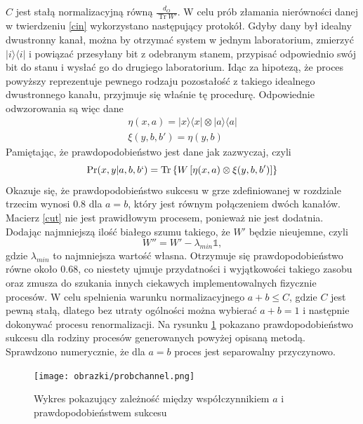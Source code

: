 \documentclass[10pt]{article} %
\DeclareMathOperator{\Trs}{Tr}
\newcommand{\Ket}[1]{|#1\rangle}
\newcommand{\Bra}[1]{\langle#1|}
\newcommand{\I}{\mathbb{1}}
\begin{document}
$C$ jest stałą normalizacyjną równą $\frac{d_O}{\Trs W'}$.
W celu prób złamania nierówności danej w twierdzeniu \ref{cin} wykorzystano następujący protokół. Gdyby dany był idealny dwustronny kanał, można by otrzymać system w jednym laboratorium, zmierzyć $\Ket{i}\Bra{i}$ i powiązać przesyłany bit z odebranym stanem, przypisać odpowiednio swój bit do stanu i wysłać go do drugiego laboratorium. Idąc za hipotezą, że proces powyższy reprezentuje pewnego rodzaju pozostałość z takiego idealnego dwustronnego kanału, przyjmuje się właśnie tę procedurę. Odpowiednie odwzorowania są więc dane
\begin{gather}
\eta(x,a) = \Ket{x}\Bra{x} \otimes \Ket{a}\Bra{a} \\
\xi(y,b,b') = \eta(y,b)
\end{gather}
Pamiętając, że prawdopodobieństwo jest dane jak zazwyczaj, czyli
\begin{equation}
\Pr(x,y|a,b,b`) = \Trs\left\{{W\left[\eta(x,a) \otimes \xi(y,b,b') \right]}\right\}
\end{equation}
Okazuje się, że prawdopodobieństwo sukcesu w grze zdefiniowanej w rozdziale trzecim wynosi $0.8$ dla $a=b$, który jest równym połączeniem dwóch kanałów.
Macierz \eqref{cut} nie jest prawidłowym procesem, ponieważ nie jest dodatnia. Dodając najmniejszą ilość białego szumu takiego, że $W'$ będzie nieujemne, czyli
\begin{equation}
W'' = W' - \lambda_{min} \I,
\end{equation} gdzie $\lambda_{min}$ to najmniejsza wartość własna.
Otrzymuje się prawdopodobieństwo równe około $0.68$, co niestety ujmuje przydatności i wyjątkowości takiego zasobu oraz zmusza do szukania innych ciekawych implementowalnych fizycznie procesów.
W celu spelnienia warunku normalizacyjnego $a + b \leq C$, gdzie $C$ jest pewną stałą, dlatego bez utraty ogólności można wybierać $a + b = 1$ i następnie dokonywać procesu renormalizacji. Na rysunku \ref{fig:bichannel} pokazano prawdopodobieństwo sukcesu dla rodziny procesów generowanych powyżej opisaną metodą. Sprawdzono numerycznie, że dla $a = b$ proces jest separowalny przyczynowo.
\begin{figure}[t]
\centering
\texttt{[image: obrazki/probchannel.png]}
\caption{Wykres pokazujący zależność między współczynnikiem $a$ i prawdopodobieństwem sukcesu}
\label{fig:bichannel}
\end{figure}
\end{document}
